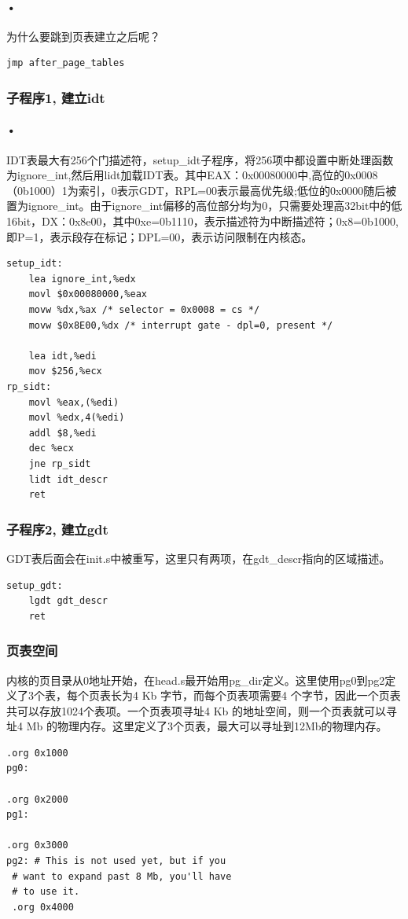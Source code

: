 \documentclass[12pt]{article}
\begin{document}
\paragraph{•}
为什么要跳到页表建立之后呢？
\begin{lstlisting}[breaklines]
	jmp after_page_tables
\end{lstlisting}
\subsubsection{子程序1, 建立idt}	
\paragraph{•}
IDT表最大有256个门描述符，setup\_idt子程序，将256项中都设置中断处理函数为ignore\_int,然后用lidt加载IDT表。其中EAX：0x00080000中,高位的0x0008（0b1000）1为索引，0表示GDT，RPL=00表示最高优先级;低位的0x0000随后被置为ignore\_int。由于ignore\_int偏移的高位部分均为0，只需要处理高32bit中的低16bit，DX：0x8e00，其中0xe=0b1110，表示描述符为中断描述符；0x8=0b1000,即P=1，表示段存在标记；DPL=00，表示访问限制在内核态。
\begin{lstlisting}[breaklines]
setup_idt:
	lea ignore_int,%edx
	movl $0x00080000,%eax
	movw %dx,%ax /* selector = 0x0008 = cs */
	movw $0x8E00,%dx /* interrupt gate - dpl=0, present */

	lea idt,%edi
	mov $256,%ecx
rp_sidt:
	movl %eax,(%edi)
	movl %edx,4(%edi)
	addl $8,%edi
	dec %ecx
	jne rp_sidt
	lidt idt_descr
	ret
\end{lstlisting}
\subsubsection{子程序2, 建立gdt}	
GDT表后面会在init.s中被重写，这里只有两项，在gdt\_descr指向的区域描述。
\begin{lstlisting}[breaklines]
setup_gdt:
	lgdt gdt_descr
	ret
\end{lstlisting}
\subsubsection{页表空间}	
内核的页目录从0地址开始，在head.s最开始用pg\_dir定义。这里使用pg0到pg2定义了3个表，每个页表长为4 Kb 字节，而每个页表项需要4 个字节，因此一个页表共可以存放1024个表项。一个页表项寻址4 Kb 的地址空间，则一个页表就可以寻址4 Mb 的物理内存。这里定义了3个页表，最大可以寻址到12Mb的物理内存。
\begin{lstlisting}[breaklines]
.org 0x1000
pg0:

.org 0x2000
pg1:

.org 0x3000
pg2: # This is not used yet, but if you
 # want to expand past 8 Mb, you'll have
 # to use it.
 .org 0x4000
\end{lstlisting}
\end{document}
